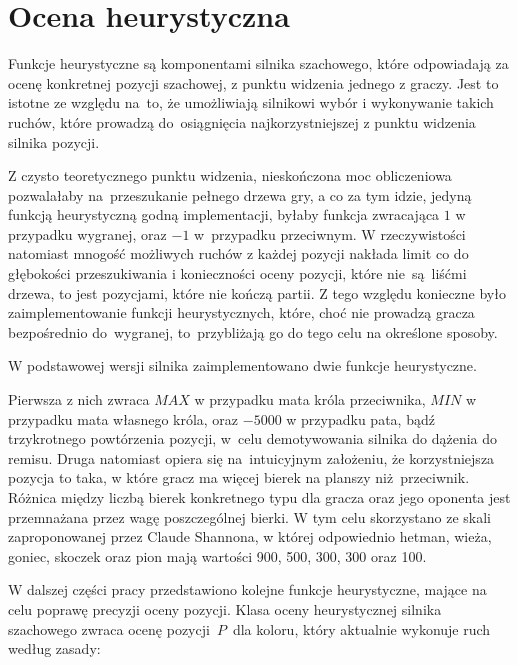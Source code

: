 \section{Ocena heurystyczna}
\label{sec:ocena-heurystyczna}

Funkcje heurystyczne są komponentami silnika szachowego, które odpowiadają za ocenę konkretnej pozycji szachowej, z punktu widzenia jednego z graczy.
Jest to istotne ze względu na~to, że umożliwiają silnikowi wybór i wykonywanie takich ruchów, które prowadzą do~osiągnięcia najkorzystniejszej z punktu widzenia silnika pozycji.

Z czysto teoretycznego punktu widzenia, nieskończona moc obliczeniowa pozwalałaby na~przeszukanie pełnego drzewa gry, a co za tym idzie, jedyną funkcją heurystyczną godną implementacji, byłaby funkcja zwracająca $1$ w przypadku wygranej, oraz $-1$ w~przypadku przeciwnym.
W rzeczywistości natomiast mnogość możliwych ruchów z każdej pozycji nakłada limit co do głębokości przeszukiwania i konieczności oceny pozycji, które nie~są~liśćmi drzewa, to jest pozycjami, które nie kończą partii.
Z tego względu konieczne było zaimplementowanie funkcji heurystycznych, które, choć nie prowadzą gracza bezpośrednio do~wygranej, to~przybliżają go do tego celu na określone sposoby.

W podstawowej wersji silnika zaimplementowano dwie funkcje heurystyczne.

Pierwsza z nich zwraca $MAX$ w przypadku mata króla przeciwnika, $MIN$ w przypadku mata własnego króla, oraz $-5000$ w przypadku pata, bądź trzykrotnego powtórzenia pozycji, w~celu demotywowania silnika do dążenia do remisu.
Druga natomiast opiera się na~intuicyjnym założeniu, że korzystniejsza pozycja to taka, w które gracz ma więcej bierek na planszy niż~przeciwnik.
Różnica między liczbą bierek konkretnego typu dla gracza oraz jego oponenta jest przemnażana przez wagę poszczególnej bierki.
W tym celu skorzystano ze skali zaproponowanej przez Claude Shannona, w której odpowiednio hetman, wieża, goniec, skoczek oraz pion mają wartości 900, 500, 300, 300 oraz 100.

W dalszej części pracy przedstawiono kolejne funkcje heurystyczne, mające na celu poprawę precyzji oceny pozycji.
Klasa oceny heurystycznej silnika szachowego zwraca ocenę pozycji~$P$~dla koloru, który aktualnie wykonuje ruch według zasady:

